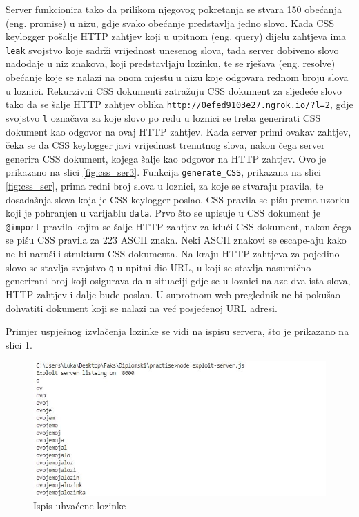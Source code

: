 \documentclass[12pt, oneside, onecolumn]{book}
\begin{document}
{Server funkcionira tako da prilikom njegovog pokretanja se stvara 150 obećanja (eng. promise) u nizu, gdje svako obećanje predstavlja jedno slovo. Kada CSS keylogger pošalje HTTP zahtjev koji u upitnom (eng. query) dijelu zahtjeva ima \texttt{leak} svojstvo koje sadrži vrijednost unesenog slova, tada server dobiveno slovo nadodaje u niz znakova, koji predstavljaju lozinku, te se rješava (eng. resolve) obećanje koje se nalazi na onom mjestu u nizu koje odgovara rednom broju slova u loznici. Rekurzivni CSS dokumenti zatražuju CSS dokument za sljedeće slovo tako da se šalje HTTP zahtjev oblika \texttt{http://0efed9103e27.ngrok.io/?l=2}, gdje svojstvo \texttt{l} označava za koje slovo po redu u loznici se treba generirati CSS dokument kao odgovor na ovaj HTTP zahtjev. Kada server primi ovakav zahtjev, čeka se da CSS keylogger javi vrijednost trenutnog slova, nakon čega server generira CSS dokument, kojega šalje kao odgovor na HTTP zahtjev. Ovo je prikazano na slici \ref{fig:css_ser3}. Funkcija \texttt{generate\_CSS}, prikazana na slici \ref{fig:css_ser}, prima redni broj slova u loznici, za koje se stvaraju pravila, te dosadašnja slova koja je CSS keylogger poslao. CSS pravila se pišu prema uzorku koji je pohranjen u varijablu \texttt{data}. Prvo što se upisuje u CSS dokument je \texttt{@import} pravilo kojim se šalje HTTP zahtjev za idući CSS dokument, nakon čega se  pišu CSS pravila za 223 ASCII znaka. Neki ASCII znakovi se escape-aju kako ne bi narušili strukturu CSS dokumenta. Na kraju HTTP zahtjeva za pojedino slovo se stavlja svojstvo \texttt{q} u upitni dio URL, u koji se stavlja nasumično generirani broj koji osigurava da u situaciji gdje se u loznici nalaze dva ista slova, HTTP zahtjev i dalje bude poslan. U suprotnom web preglednik ne bi pokušao dohvatiti dokument koji se nalazi na već posjećenoj URL adresi.

Primjer uspješnog izvlačenja lozinke se vidi na ispisu servera, što je prikazano na slici \ref{fig:css_pass}.

\begin{figure}[H]
	\begin{center}
		\includegraphics[width=\textwidth]{css_pass.jpg}
		\caption{Ispis uhvaćene lozinke} \label{fig:css_pass}
	\end{center}
\end{figure}

}
\end{document}
